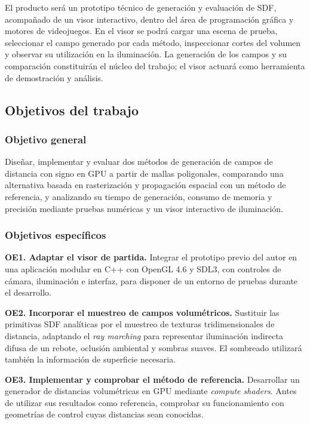 El producto será un prototipo técnico de generación y evaluación de SDF, acompañado de un visor interactivo, dentro del área de programación gráfica y motores de videojuegos. En el visor se podrá cargar una escena de prueba, seleccionar el campo generado por cada método, inspeccionar cortes del volumen y observar su utilización en la iluminación. La generación de los campos y su comparación constituirán el núcleo del trabajo; el visor actuará como herramienta de demostración y análisis.

\subsection{Objetivos del trabajo}

\subsubsection{Objetivo general}

Diseñar, implementar y evaluar dos métodos de generación de campos de distancia con signo en GPU a partir de mallas poligonales, comparando una alternativa basada en rasterización y propagación espacial con un método de referencia, y analizando su tiempo de generación, consumo de memoria y precisión mediante pruebas numéricas y un visor interactivo de iluminación.

\subsubsection{Objetivos específicos}

\textbf{OE1. Adaptar el visor de partida.} Integrar el prototipo previo del autor en una aplicación modular en C++ con OpenGL 4.6 y SDL3, con controles de cámara, iluminación e interfaz, para disponer de un entorno de pruebas durante el desarrollo.

\textbf{OE2. Incorporar el muestreo de campos volumétricos.} Sustituir las primitivas SDF analíticas por el muestreo de texturas tridimensionales de distancia, adaptando el \textit{ray marching} para representar iluminación indirecta difusa de un rebote, oclusión ambiental y sombras suaves. El sombreado utilizará también la información de superficie necesaria.

\textbf{OE3. Implementar y comprobar el método de referencia.} Desarrollar un generador de distancias volumétricas en GPU mediante \textit{compute shaders}. Antes de utilizar sus resultados como referencia, comprobar su funcionamiento con geometrías de control cuyas distancias sean conocidas.

